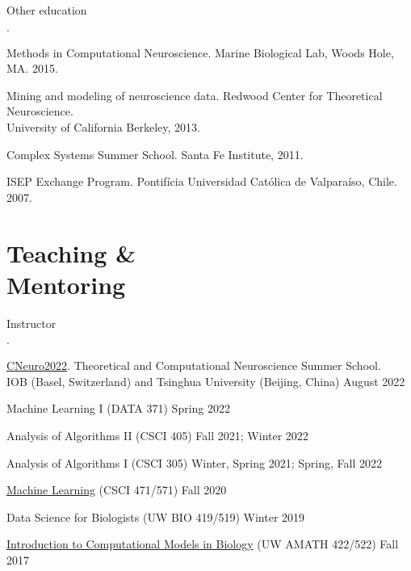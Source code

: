 \documentclass[margin,line]{res}
\newenvironment{list1}{
  \begin{list}{$\cdot$}{%
      \setlength{\itemsep}{0in}
      \setlength{\parsep}{0in} \setlength{\parskip}{0in}
      \setlength{\topsep}{0in} \setlength{\partopsep}{0in} 
      \setlength{\leftmargin}{0.17in}}}{\end{list}}
\begin{document}
\begin{resume}
  Other education
  \begin{list1}
  \item Methods in Computational Neuroscience. Marine Biological Lab, Woods Hole, MA. 2015.
  \item  Mining and modeling of neuroscience data. 
    Redwood Center for Theoretical Neuroscience. \\
    University of California Berkeley, 2013.
  \item Complex Systems Summer School. Santa Fe Institute, 2011.
  \item ISEP Exchange Program. 
    Pontif\'{i}cia Universidad Cat\'{o}lica de Valpara\'{i}so, Chile. 2007.
  \end{list1}

  \section{\sc Teaching \&\\Mentoring}

  Instructor
  \begin{list1}
  \item \href{https://www.cneuro.net/cneuro2022}{CNeuro2022}.
    Theoretical and Computational Neuroscience Summer School.\\
    IOB (Basel, Switzerland) and Tsinghua University (Beijing, China)
    \hfill
    August 2022
  \item Machine Learning I (DATA 371) \hfill Spring 2022
  \item Analysis of Algorithms II (CSCI 405) \hfill Fall 2021; Winter 2022
  \item Analysis of Algorithms I (CSCI 305)
    \hfill Winter, Spring 2021; Spring, Fall 2022
  \item \href{https://glomerul.us/teaching/CSCI-471/2020-Fall/}{Machine Learning}
    (CSCI 471/571) \hfill Fall 2020
  \item Data Science for Biologists (UW BIO 419/519) \hfill Winter 2019
  \item \href{https://glomerul.us/teaching/422-522/}
    {Introduction to Computational Models in Biology} (UW AMATH 422/522) 
    \hfill Fall 2017
  \end{list1}


\end{resume}
\end{document}
